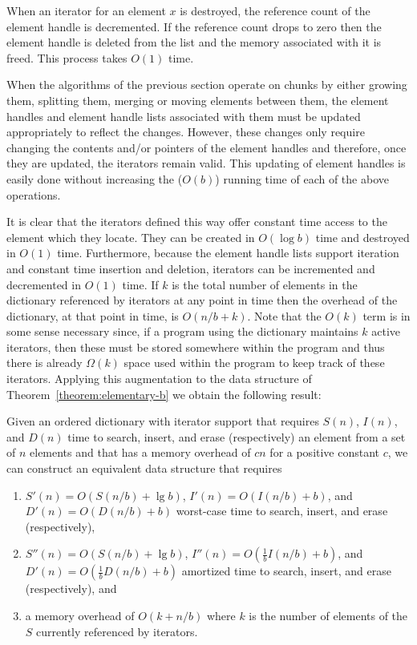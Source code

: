 \documentclass{DIKU-article}
\newcommand{\thmref}[1]{Theorem~\ref{theorem:#1}}
\begin{document}
When an iterator for an element $x$ is destroyed, the reference count
of the element handle is decremented. If the reference count drops to
zero then the element handle is deleted from the list and the memory
associated with it is freed.  This process takes $O(1)$ time.

When the algorithms of the previous section operate on chunks by
either growing them, splitting them, merging or moving elements
between them, the element handles and element handle lists associated
with them must be updated appropriately to reflect the changes.
However, these changes only require changing the contents and/or
pointers of the element handles and therefore, once they are updated,
the iterators remain valid.  This updating of element handles is
easily done without increasing the ($O(b)$) running time of each of
the above operations.

It is clear that the iterators defined this way offer constant time
access to the element which they locate.  They can be created in
$O(\log b)$ time and destroyed in $O(1)$ time.  Furthermore, because
the element handle lists support iteration and constant time insertion
and deletion, iterators can be incremented and decremented in $O(1)$
time.  If $k$ is the total number of elements in the dictionary
referenced by iterators at any point in time then the overhead of the
dictionary, at that point in time, is $O(n/b+k)$.  Note that the
$O(k)$ term is in some sense necessary since, if a program using the
dictionary maintains $k$ active iterators, then these must be stored
somewhere within the program and thus there is already $\Omega(k)$
space used within the program to keep track of these iterators.
Applying this augmentation to the data structure of
\thmref{elementary-b} we obtain the following result:

\begin{theorem}\label{theorem:iterator-a}
Given an ordered dictionary with iterator support that requires 
$S(n)$, $I(n)$, and $D(n)$
time to search, insert, and erase (respectively) an element from a
set of $n$ elements and that has a memory overhead of $cn$ for a
positive constant $c$, we can construct an equivalent data structure
that requires 
\begin{enumerate}
\item $S'(n)=O(S(n/b)+\lg b)$, $I'(n)=O(I(n/b)+b)$,
and $D'(n)=O(D(n/b)+b)$ worst-case time to search, insert,
and erase (respectively), 
\item $S''(n)=O(S(n/b)+\lg b)$,
$I''(n)=O(\frac{1}{b}I(n/b)+b)$, and
$D'(n)=O(\frac{1}{b}D(n/b)+b)$ amortized time to search,
insert, and erase (respectively), and 
\item a memory overhead of
$O(k+n/b)$ where $k$ is the number of elements of the $S$ currently 
referenced by iterators.
\end{enumerate}
\end{theorem}
\end{document}
